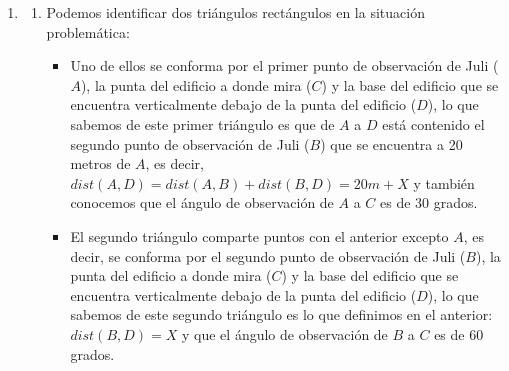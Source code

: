 \documentclass[12pt]{article}
\begin{document}
\begin{enumerate}
\begin{enumerate}
        \item Sabemos que 
            \begin{align*}
            cosec(t) =& \frac{1}{sen(t)} = \frac{1}{-\frac{\sqrt{3}}{2}} = -\frac{2\sqrt{3}}{3} \\
            tg(t) =&\frac{sen(t)}{cos(t)} = \frac{-\frac{\sqrt{3}}{2}}{-\frac{1}{2}} = \sqrt{3}\\
            cotan(t) =&\frac{cos(t)}{sen(t)} = \frac{1}{\sqrt{3}} = \frac{\sqrt{3}}{3} 
            \end{align*}
             \end{enumerate} 
    \item \begin{enumerate}
        \item Podemos identificar dos triángulos rectángulos en la situación problemática:
    \begin{itemize}
        \item Uno de ellos se conforma por el primer punto de observación de Juli ($A$), la punta del edificio a donde mira ($C$) y la base del edificio que se encuentra verticalmente debajo de la punta del edificio ($D$), lo que sabemos de este primer triángulo es que de $A$ a $D$ está contenido el segundo punto de observación de Juli ($B$) que se encuentra a 20 metros de $A$, es decir, $dist(A,D)=dist(A,B)+dist(B,D)=20m + X$ y también conocemos que el ángulo de observación de $A$ a $C$ es de 30 grados.
        \item El segundo triángulo comparte puntos con el anterior excepto $A$, es decir, se conforma por el segundo punto de observación de Juli ($B$), la punta del edificio a donde mira ($C$) y la base del edificio que se encuentra verticalmente debajo de la punta del edificio ($D$), lo que sabemos de este segundo triángulo es lo que definimos en el anterior: $dist(B,D)=X$ y que el ángulo de observación de $B$ a $C$ es de 60 grados.
    \end{itemize}

    \begin{center}
\end{center}
\end{enumerate}
\end{enumerate}
\end{document}
